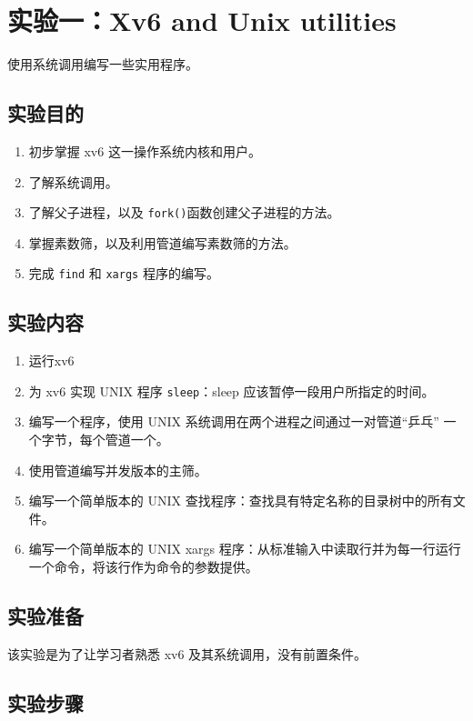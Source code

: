 \section{实验一：Xv6 and Unix utilities}\label{sec:Xv6 and Unix utilities}

使用系统调用编写一些实用程序。

\subsection{实验目的}

\begin{enumerate}
	\item 初步掌握 xv6 这一操作系统内核和用户。
	\item 了解系统调用。
	\item 了解父子进程，以及 \texttt{fork()}函数创建父子进程的方法。
	\item 掌握素数筛，以及利用管道编写素数筛的方法。
	\item 完成 \texttt{find} 和 \texttt{xargs} 程序的编写。
\end{enumerate}

\subsection{实验内容}

\begin{enumerate}
	\item 运行xv6
	\item 为 xv6 实现 UNIX 程序 \texttt{sleep}：sleep 应该暂停一段用户所指定的时间。
	\item 编写一个程序，使用 UNIX 系统调用在两个进程之间通过一对管道“乒乓” 一个字节，每个管道一个。
	\item 使用管道编写并发版本的主筛。
	\item 编写一个简单版本的 UNIX 查找程序：查找具有特定名称的目录树中的所有文件。
	\item 编写一个简单版本的 UNIX xargs 程序：从标准输入中读取行并为每一行运行一个命令，将该行作为命令的参数提供。
\end{enumerate}

\subsection{实验准备}

该实验是为了让学习者熟悉 xv6 及其系统调用，没有前置条件。

\subsection{实验步骤}

